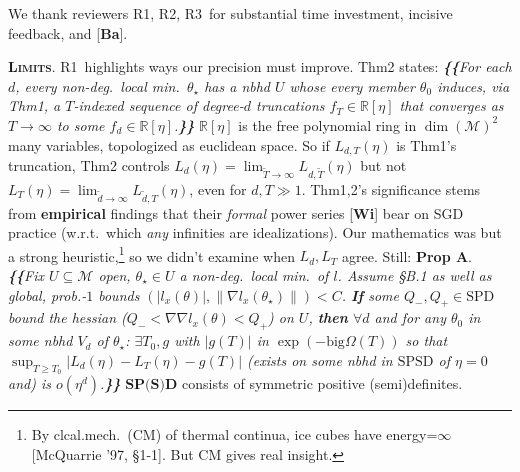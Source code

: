 \documentclass[12pt]{colt2021} %
\newcommand{\Ra}{\textmd{\textsf{\color{purple!50} {R1}}}}
\newcommand{\Rb}{\textmd{\textsf{\color{green!60}  {R2}}}}
\newcommand{\Rc}{\textmd{\textsf{\color{blue!50}   {R3}}}}
\newcommand{\Mm}{\mathcal{M}}
\newcommand{\RR}{\mathbb{R}}
\newcommand{\pag}[1]{\textmd{{\color{gray}Pg}{#1}}}
\newcommand{\pgph}[1]{\textmd{{\color{gray}Par}{#1}}}
\newcommand{\thm}[1]{\textmd{{\color{gray}Thm}{#1}}}
\newcommand{\cit}[1]{[\textbf{#1}]}
\newcommand{\moosect}[1]{\par\noindent\hspace{-1cm}\textsc{\textbf{#1}}.}
\begin{document}
    \newcommand{\LaT}{\Lambda_{\text{\tiny\VarClock}}}
    \newcommand{\Lad}{\Lambda_{\text{\tiny\Thermo{4}}}}

    \noindent
    We thank reviewers \Ra, \Rb, \Rc\ for substantial time investment, incisive feedback, and \cit{Ba}. 

\moosect{Limits}
    \Ra\ highlights ways our precision must improve. %
    \thm{2} states:
    \emph{\textbf{\{\!\{}For each $d$, every non-deg.\ local min.\ $\theta_\star$ has a nbhd $U$
        whose every member $\theta_0$ induces, via \thm{1}, a
        $T$-indexed sequence of degree-$d$ truncations $f_T\in \RR[\eta]$ that
        converges
        as $T\to \infty$ to
        some $f_d\in\RR[\eta]$.\textbf{\}\!\}}}
    $\RR[\eta]$ is the free polynomial ring in $\dim(\Mm)^2$ many
    variables, topologized as euclidean space.
    \noindent
    So if $L_{d,T}(\eta)$ is \thm{1}'s truncation, \thm{2}
    controls $L_d(\eta) = \lim_{\tilde T\to\infty} L_{d,\tilde T}(\eta)$ but not
    $L_T(\eta) = \lim_{\tilde d\to\infty} L_{\tilde d,T}(\eta)$, even for $d,T\gg 1$. 
    \thm{1,2}'s significance stems from \textbf{empirical} findings that
    their \emph{formal} power series \cit{Wi} bear on SGD practice (w.r.t.\ which \emph{any}
    infinities are idealizations).   
    Our mathematics was but a strong
    heuristic,\footnote{%
        By clcal.mech.\ (CM) of thermal continua, ice cubes have
        energy=$\infty$ [McQuarrie '97, \S{1-1}].
        But CM gives real insight.
    } so we didn't examine when 
    $L_d, L_T$ agree.  Still:
    \textbf{Prop A}.\emph{
    \textbf{\{\!\{}Fix $U\subseteq \Mm$ open, %
        $\theta_\star\in U$ a non-deg.\ local min.\ of $l$.
        Assume \S{B.1} as well as global, prob.-$1$ bounds $(|l_x(\theta)|,\|\nabla
        l_x(\theta_\star)\|)<C$.
        \textbf{If} some $Q_-,Q_+\in \text{SPD}$ bound the hessian
        ($Q_- < \nabla\nabla l_x(\theta)<Q_+$) on $U$,
        \textbf{then} $\forall d$ and for any $\theta_0$ in
        some nbhd $V_d$ of $\theta_\star$: $\exists T_0, g$ with
        $|g(T)|$ in $\exp(-\text{big}\Omega(T))$ so that
        $\sup_{T\geq T_0} |L_d(\eta)-L_T(\eta)-g(T)|$
        (exists on some nbhd in $\text{SPSD}$ of
        $\eta=0$ and) is
        $o(\eta^d)$.\textbf{\}\!\}}
    }
    $\textbf{SP(S)D}$ consists of symmetric positive
        (semi)definites.
\end{document}
